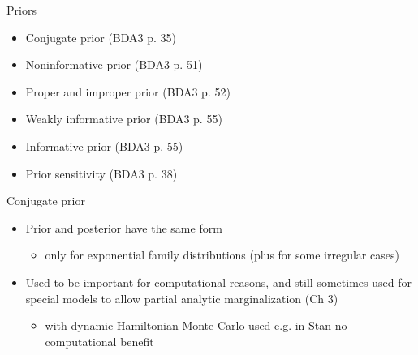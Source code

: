 \documentclass[english,t]{beamer}
\begin{document}

\begin{frame}{Priors}

  \begin{itemize}
  \item Conjugate prior (BDA3 p. 35)
  \item Noninformative prior (BDA3 p. 51)
  \item Proper and improper prior (BDA3 p. 52)
  \item Weakly informative prior (BDA3 p. 55)
  \item Informative prior (BDA3 p. 55)
  \item Prior sensitivity (BDA3 p. 38)
  \end{itemize}

\end{frame}

\begin{frame}
{Conjugate prior}

  \begin{itemize}
  \item Prior and posterior have the same form
    \begin{itemize}
    \item only for exponential family distributions (plus for
      some irregular cases)
    \end{itemize}
  \item Used to be important for computational reasons, and still
    sometimes used for special models to allow partial analytic
    marginalization (Ch 3)
    \begin{itemize}
    \item with dynamic Hamiltonian Monte Carlo used e.g. in Stan no
      computational benefit
    \end{itemize}
  \end{itemize}
  
\end{frame}
\end{document}
